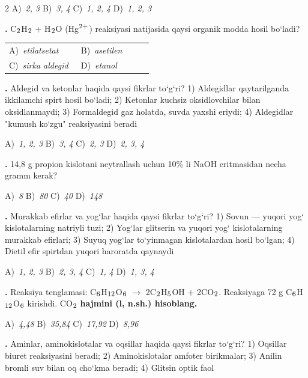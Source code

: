 \documentclass[11pt,a4paper]{article}
\renewcommand{\textsubscript}[1]{\ensuremath{_{\text{\fontsize{8}{8}\selectfont #1}}}}
\renewcommand{\textsuperscript}[1]{\ensuremath{^{\text{\fontsize{8}{8}\selectfont #1}}}}
\newcommand{\qn}[1]{\textbf{\fontsize{11.5}{13}\selectfont #1}}
\newcommand{\qsep}{\par\vspace{1pt}\noindent\rule{0pt}{0.4pt}\par\vspace{5pt}}
\begin{document}
\begin{multicols}{2}
\noindent A)~\textsl{2, 3} \hfill B)~\textsl{3, 4} \hfill C)~\textsl{1, 2, 4} \hfill D)~\textsl{1, 2, 3}\par
\qsep
\noindent\qn{23.} C\textsubscript{2}H\textsubscript{2} + H\textsubscript{2}O (Hg\textsuperscript{2+}) reaksiyasi natijasida qaysi organik modda hosil bo`ladi?

\noindent\begin{tabular}{@{}p{0.47\linewidth}@{}p{0.47\linewidth}@{}}
A)~\textsl{etilatsetat} & B)~\textsl{asetilen} \\
C)~\textsl{sirka aldegid} & D)~\textsl{etanol} \\
\end{tabular}\par
\qsep
\noindent\qn{24.} Aldegid va ketonlar haqida qaysi fikrlar to`g`ri? 1) Aldegidlar qaytarilganda ikkilamchi spirt hosil bo`ladi; 2) Ketonlar kuchsiz oksidlovchilar bilan oksidlanmaydi; 3) Formaldegid gaz holatda, suvda yaxshi eriydi; 4) Aldegidlar "kumush ko`zgu" reaksiyasini beradi

\noindent A)~\textsl{1, 2, 3} \hfill B)~\textsl{3, 4} \hfill C)~\textsl{2, 3} \hfill D)~\textsl{2, 3, 4}\par
\qsep
\noindent\qn{25.} 14,8 g propion kislotani neytrallash uchun 10\% li NaOH eritmasidan necha gramm kerak?

\noindent A)~\textsl{8} \hfill B)~\textsl{80} \hfill C)~\textsl{40} \hfill D)~\textsl{148}\par
\qsep
\noindent\qn{26.} Murakkab efirlar va yog`lar haqida qaysi fikrlar to`g`ri? 1) Sovun --- yuqori yog` kislotalarning natriyli tuzi; 2) Yog`lar glitserin va yuqori yog` kislotalarning murakkab efirlari; 3) Suyuq yog`lar to`yinmagan kislotalardan hosil bo`lgan; 4) Dietil efir spirtdan yuqori haroratda qaynaydi

\noindent A)~\textsl{1, 2, 3} \hfill B)~\textsl{2, 3, 4} \hfill C)~\textsl{1, 4} \hfill D)~\textsl{1, 3, 4}\par
\qsep
\noindent\qn{27.} Reaksiya tenglamasi: C\textsubscript{6}H\textsubscript{12}O\textsubscript{6} $\to$ 2C\textsubscript{2}H\textsubscript{5}OH + 2CO\textsubscript{2}. Reaksiyaga 72 g C\textsubscript{6}H\textsubscript{12}O\textsubscript{6} kirishdi. CO\textsubscript{2} \textbf{hajmini (l, n.sh.) hisoblang.}

\noindent A)~\textsl{4,48} \hfill B)~\textsl{35,84} \hfill C)~\textsl{17,92} \hfill D)~\textsl{8,96}\par
\qsep
\noindent\qn{28.} Aminlar, aminokislotalar va oqsillar haqida qaysi fikrlar to`g`ri? 1) Oqsillar biuret reaksiyasini beradi; 2) Aminokislotalar amfoter birikmalar; 3) Anilin bromli suv bilan oq cho`kma beradi; 4) Glitsin optik faol


\end{multicols}
\end{document}
